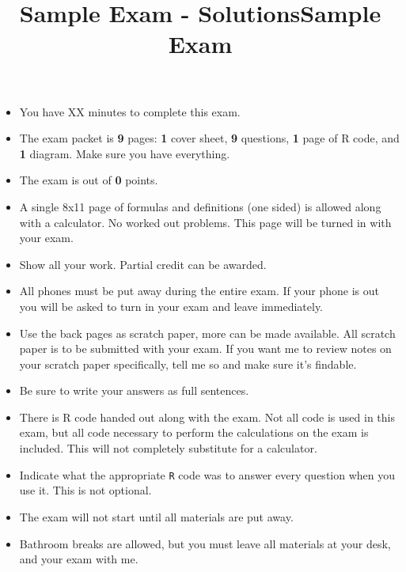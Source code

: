 \documentclass{article}\usepackage[]{graphicx}\usepackage[]{color}
\newcommand{\R}[1]{\texttt{#1}}
\begin{document}

  {\title{Sample Exam - Solutions}
  \maketitle}
  {\title{Sample Exam}
\maketitle

\begin{itemize}
  \item You have XX minutes to complete this exam.
  \item The exam packet is \textbf{9} pages: \textbf{1} cover sheet, \textbf{9} questions, \textbf{1} page of R code, and \textbf{1} diagram. Make sure you have everything.
  \item The exam is out of \textbf{0} points.
  \item A single 8x11 page of formulas and definitions (one sided) is allowed along with a calculator. No worked out problems. This page will be turned in with your exam.
  \item Show all your work. Partial credit can be awarded.
  \item All phones must be put away during the entire exam. If your phone is out you will be asked to turn in your exam and leave immediately.
  \item Use the back pages as scratch paper, more can be made available. All scratch paper is to be submitted with your exam. If you want me to review notes on your scratch paper specifically, tell me so and make sure it's findable.
  \item Be sure to write your answers as full sentences.
  \item There is R code handed out along with the exam. Not all code is used in this exam, but all code necessary to perform the calculations on the exam is included. This will not completely substitute for a calculator.
      \item Indicate what the appropriate \R{R} code was to answer every question when you use it. This is not optional.
  \item The exam will not start until all materials are put away.
  \item Bathroom breaks are allowed, but you must leave all materials at your desk, and your exam with me.
\end{itemize}

}
\end{document}
